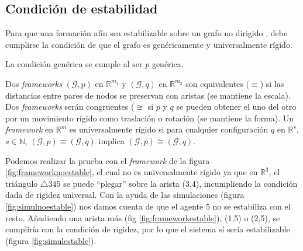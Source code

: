 \documentclass[11pt, a4paper]{article} %
\begin{document}
\subsection{Condición de estabilidad}
Para que una formación afín sea estabilizable sobre un grafo no dirigido \cite{7339680}, debe cumplirse la condición de que el grafo es genéricamente y universalmente rígido. 

La condición genérica se cumple al ser $p$ genérica.

Dos \textit{frameworks} $(\mathcal{G},p)$ en $\mathbb{R}^{m_1}$ y $(\mathcal{G},q)$ en $\mathbb{R}^{m_2}$ son equivalentes ($\equiv$) si las distancias entre pares de nodos se preservan con aristas (se mantiene la escala). Dos \textit{frameworks} serán congruentes ($\cong$ si $p$ y $q$ se pueden obtener el uno del otro por un movimiento rígido como traslación o rotación (se mantiene la forma).
Un \textit{framework} en $\mathbb{R}^m$ es universalmente rígido si para cualquier configuración $q$ en $\mathbb{R}^s$, $s\in\mathbb{N}$, $(\mathcal{G},p) \equiv (\mathcal{G}, q)$ implica $(\mathcal{G},p) \cong (\mathcal{G}, q)$.

Podemos realizar la prueba con el \textit{framework} de la figura \ref{fig:frameworknoestable}, el cual no es universalmente rígido ya que en $\mathbb{R}^3$, el triángulo $\triangle 345$ se puede “plegar” sobre la arista (3,4), incumpliendo la condición dada de rigidez universal. Con la ayuda de las simulaciones (figura \ref{fig:simulnoestable}) nos damos cuenta de que el agente 5 no se estabiliza con el resto. Añadiendo una arista más (fig \ref{fig:frameworkestable}), (1,5) o (2,5), se cumpliría con la condición de rigidez, por lo que el sistema sí sería estabilizable (figura \ref{fig:simulestable}).
\end{document}
